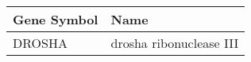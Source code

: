 \begin{tabular}{ll}
\toprule
Gene Symbol &                    Name \\
\midrule
     DROSHA & drosha ribonuclease III \\
\bottomrule
\end{tabular}
